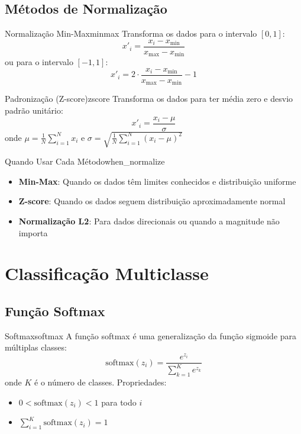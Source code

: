 \documentclass[a4paper,12pt]{article}
\begin{document}
\subsection{Métodos de Normalização}

\begin{definicao}{Normalização Min-Max}{minmax}
Transforma os dados para o intervalo $[0, 1]$:
\[
x'_i = \frac{x_i - x_{\min}}{x_{\max} - x_{\min}}
\]
ou para o intervalo $[-1, 1]$:
\[
x'_i = 2 \cdot \frac{x_i - x_{\min}}{x_{\max} - x_{\min}} - 1
\]
\end{definicao}

\begin{definicao}{Padronização (Z-score)}{zscore}
Transforma os dados para ter média zero e desvio padrão unitário:
\[
x'_i = \frac{x_i - \mu}{\sigma}
\]
onde $\mu = \frac{1}{N}\sum_{i=1}^{N} x_i$ e $\sigma = \sqrt{\frac{1}{N}\sum_{i=1}^{N} (x_i - \mu)^2}$
\end{definicao}

\begin{observacao}{Quando Usar Cada Método}{when_normalize}
\begin{itemize}
    \item \textbf{Min-Max}: Quando os dados têm limites conhecidos e distribuição uniforme
    \item \textbf{Z-score}: Quando os dados seguem distribuição aproximadamente normal
    \item \textbf{Normalização L2}: Para dados direcionais ou quando a magnitude não importa
\end{itemize}
\end{observacao}

\section{Classificação Multiclasse}

\subsection{Função Softmax}

\begin{definicao}{Softmax}{softmax}
A função softmax é uma generalização da função sigmoide para múltiplas classes:
\[
\text{softmax}(z_i) = \frac{e^{z_i}}{\sum_{k=1}^{K} e^{z_k}}
\]
onde $K$ é o número de classes. Propriedades:
\begin{itemize}
    \item $0 < \text{softmax}(z_i) < 1$ para todo $i$
    \item $\sum_{i=1}^{K} \text{softmax}(z_i) = 1$
\end{itemize}
\end{definicao}
\end{document}
